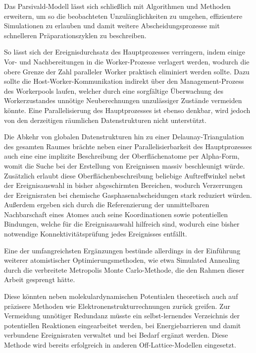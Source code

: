 Das Parsivald-Modell lässt sich schließlich mit Algorithmen und Methoden erweitern, um so die beobachteten Unzulänglichkeiten zu umgehen, effizientere Simulationen zu erlauben und damit weitere Abscheidungsprozesse mit schnelleren Präparationszyklen zu beschreiben.

So lässt sich der Ereignisdurchsatz des Hauptprozesses verringern, indem einige Vor- und Nachbereitungen in die Worker-Prozesse verlagert werden, wodurch die obere Grenze der Zahl paralleler Worker praktisch eliminiert werden sollte.
Dazu sollte die Host-\-Worker-\-Kom\-mu\-ni\-ka\-tion indirekt über den Management-Prozess des Workerpools laufen, welcher durch eine sorgfältige Überwachung des Workerzustandes unnötige Neuberechnungen unzulässiger Zustände vermeiden könnte.
Eine Parallelisierung des Hauptprozesses ist ebenso denkbar, wird jedoch von den derzeitigen räumlichen Datenstrukturen nicht unterstützt.

Die Abkehr von globalen Datenstrukturen hin zu einer Delaunay-Triangulation des gesamten Raumes brächte neben einer Parallelisierbarkeit des Hauptprozesses auch eine eine implizite Beschreibung der Oberflächenatome per Alpha-Form, womit die Suche bei der Erstellung von Ereignissen massiv beschleunigt würde.
Zusätzlich erlaubt diese Oberflächenbeschreibung beliebige Auftreffwinkel nebst der Ereignisauswahl in bisher abgeschirmten Bereichen, wodurch Verzerrungen der Ereignisraten bei chemische Gasphasenabscheidungen stark reduziert würden.
Außerdem ergeben sich durch die Referenzierung der unmittelbaren Nachbarschaft eines Atomes auch seine Koordinationen sowie potentiellen Bindungen, welche für die Ereignisauswahl hilfreich sind, wodurch eine bisher notwendige Konnektivitätsprüfung jedes Ereignisses entfällt.

Eine der umfangreichsten Ergänzungen bestünde allerdings in der Einführung weiterer atomistischer Optimierungsmethoden, wie etwa Simulated Annealing durch die verbreitete Metropolis Monte Carlo-Methode, die den Rahmen dieser Arbeit gesprengt hätte.

Diese könnten neben molekulardynamischen Potentialen theoretisch auch auf präzisere Methoden wie Elektronenstrukturrechnungen zurück greifen.
Zur Vermeidung unnötiger Redundanz müsste ein selbst-lernendes Verzeichnis der potentiellen Reaktionen eingearbeitet werden, bei Energiebarrieren und damit verbundene Ereignisraten verwaltet und bei Bedarf ergänzt werden.
Diese Methode wird bereits erfolgreich in anderen Off-Lattice-Modellen eingesetzt\cite{biehl_off-lattice_2005,stamatakis_graph-theoretical_2011}.
